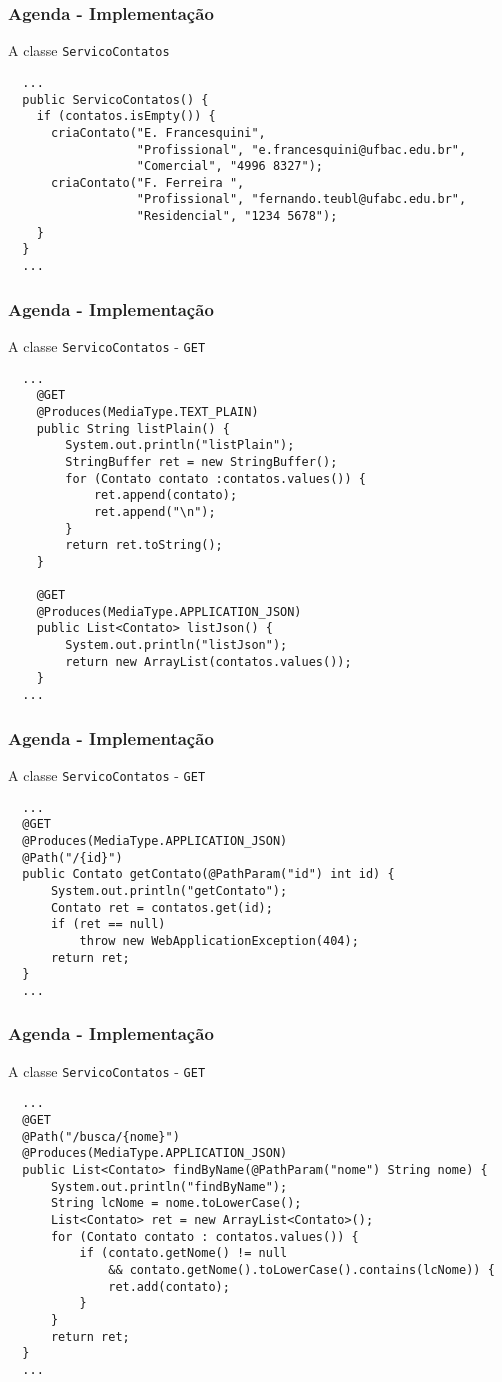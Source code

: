 \documentclass[Ligatures=TeX,table,brazil,svgnames,usetotalslideindicator,comp
ress,10pt]{beamer}
\begin{document}
\begin{frame}[fragile]
  \frametitle{Agenda - Implementação}
  A classe \texttt{ServicoContatos}
{\footnotesize
\begin{verbatim}
  ...
  public ServicoContatos() {
    if (contatos.isEmpty()) {
      criaContato("E. Francesquini",
                  "Profissional", "e.francesquini@ufbac.edu.br",
                  "Comercial", "4996 8327");
      criaContato("F. Ferreira ",
                  "Profissional", "fernando.teubl@ufabc.edu.br",
                  "Residencial", "1234 5678");
    }
  }
  ...
\end{verbatim}
}
\end{frame}


\begin{frame}[fragile]
  \frametitle{Agenda - Implementação}
  A classe \texttt{ServicoContatos} - \texttt{GET}
{\footnotesize
\begin{verbatim}
  ...
    @GET
    @Produces(MediaType.TEXT_PLAIN)
    public String listPlain() {
        System.out.println("listPlain");
        StringBuffer ret = new StringBuffer();
        for (Contato contato :contatos.values()) {
            ret.append(contato);
            ret.append("\n");
        }
        return ret.toString();
    }

    @GET
    @Produces(MediaType.APPLICATION_JSON)
    public List<Contato> listJson() {
        System.out.println("listJson");
        return new ArrayList(contatos.values());
    }
  ...
\end{verbatim}
}
\end{frame}

\begin{frame}[fragile]
  \frametitle{Agenda - Implementação}
  A classe \texttt{ServicoContatos} - \texttt{GET}
{\footnotesize
\begin{verbatim}
  ...
  @GET
  @Produces(MediaType.APPLICATION_JSON)
  @Path("/{id}")
  public Contato getContato(@PathParam("id") int id) {
      System.out.println("getContato");
      Contato ret = contatos.get(id);
      if (ret == null)
          throw new WebApplicationException(404);
      return ret;
  }
  ...
\end{verbatim}
}
\end{frame}

\begin{frame}[fragile]
  \frametitle{Agenda - Implementação}
  A classe \texttt{ServicoContatos} - \texttt{GET}
{\footnotesize
\begin{verbatim}
  ...
  @GET
  @Path("/busca/{nome}")
  @Produces(MediaType.APPLICATION_JSON)
  public List<Contato> findByName(@PathParam("nome") String nome) {
      System.out.println("findByName");
      String lcNome = nome.toLowerCase();
      List<Contato> ret = new ArrayList<Contato>();
      for (Contato contato : contatos.values()) {
          if (contato.getNome() != null
              && contato.getNome().toLowerCase().contains(lcNome)) {
              ret.add(contato);
          }
      }
      return ret;
  }
  ...
\end{verbatim}
}
\end{frame}
\end{document}
